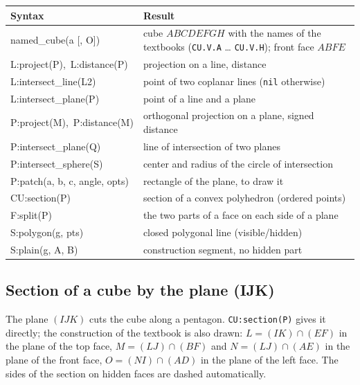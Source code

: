\documentclass[11pt]{article}
\newcommand\code[1]{\texttt{#1}}
\begin{document}
\begin{center}
\begin{tabular}{>{\ttfamily}l p{8.3cm}}
\toprule
\textrm{Syntax} & Result \\
\midrule
named\_cube(a [, O])      & cube $ABCDEFGH$ with the names of the textbooks
                            (\code{CU.V.A} \ldots{} \code{CU.V.H}); front face
                            $ABFE$ \\
L:project(P),\ L:distance(P) & projection on a line, distance \\
L:intersect\_line(L2)     & point of two coplanar lines (\code{nil} otherwise) \\
L:intersect\_plane(P)     & point of a line and a plane \\
P:project(M),\ P:distance(M) & orthogonal projection on a plane, signed distance \\
P:intersect\_plane(Q)     & line of intersection of two planes \\
P:intersect\_sphere(S)    & center and radius of the circle of intersection \\
P:patch(a, b, c, angle, opts) & rectangle of the plane, to draw it \\
CU:section(P)             & section of a convex polyhedron (ordered points) \\
F:split(P)                & the two parts of a face on each side of a plane \\
S:polygon(g, pts)         & closed polygonal line (visible/hidden) \\
S:plain(g, A, B)          & construction segment, no hidden part \\
\bottomrule
\end{tabular}
\end{center}

\subsection{Section of a cube by the plane (IJK)}

The plane $(IJK)$ cuts the cube along a pentagon. \code{CU:section(P)} gives it directly; the construction of the textbook is also drawn: $L=(IK)\cap(EF)$ in the plane of the top face, $M=(LJ)\cap(BF)$ and $N=(LJ)\cap(AE)$ in the plane of the front face, $O=(NI)\cap(AD)$ in the plane of the left face. The sides of the section on hidden faces are dashed automatically.
\end{document}
